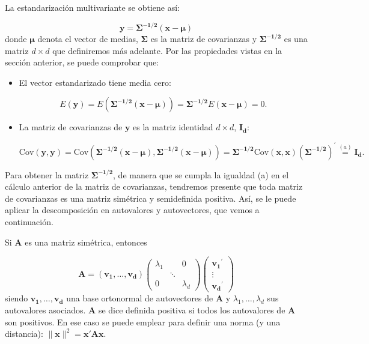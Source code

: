 \documentclass[
  a4paper,
  oneside]{scrbook}
\theoremstyle{definition}
\theoremstyle{definition}
\theoremstyle{definition}
\theoremstyle{definition}
\theoremstyle{remark}
\begin{document}
La estandarización multivariante se obtiene así:

\[\bm{y}=\bm{\Sigma^{-1/2}}(\bm{x}-\bm\mu)\] donde \(\bm\mu\) denota el
vector de medias, \(\bm\Sigma\) es la matriz de covarianzas y
\(\bm{\Sigma^{-1/2}}\) es una matriz \(d\times d\) que definiremos más
adelante. Por las propiedades vistas en la sección anterior, se puede
comprobar que:

\begin{itemize}
\item
  El vector estandarizado tiene media cero:

  \[E(\bm{y})=E(\bm{\Sigma^{-1/2}}(\bm{x}-\bm\mu))=\bm{\Sigma^{-1/2}}E(\bm{x}-\bm\mu)=0.\]
\item
  La matriz de covarianzas de \(\bm{y}\) es la matriz identidad \(d\times d\), \(\bm{I_d}\):

  \[\mbox{Cov}(\bm{y},\bm{y})=\mbox{Cov}(\bm{\Sigma^{-1/2}}(\bm{x}-\bm\mu),\bm{\Sigma^{-1/2}}(\bm{x}-\bm\mu))=\bm{\Sigma^{-1/2}}\mbox{Cov}(\bm{x},\bm{x})(\bm{\Sigma^{-1/2}})^\prime{}
  \stackrel{(a)}{=}\bm{I_d}.\]
\end{itemize}

Para obtener la matriz \(\bm{\Sigma^{-1/2}}\), de manera que se cumpla la
igualdad (a) en el cálculo anterior de la matriz de covarianzas,
tendremos presente que toda matriz de covarianzas es una matriz
simétrica y semidefinida positiva. Así, se le puede aplicar la
descomposición en autovalores y autovectores, que vemos a continuación.

Si \(\bm{A}\) es una matriz simétrica, entonces

\[\bm{A}=\left(\bm{v_1},\ldots,\bm{v_d}\right)\left(\begin{array}{ccc}
\lambda_1 & & 0 \\
 & \ddots & \\
 0 & & \lambda_d
 \end{array}\right)\left(\begin{array}{c}
 \bm{v_1}^{\prime} \\
 \vdots \\
 \bm{v_d}^{\prime}
 \end{array}\right)\]
siendo \(\bm{v_1},\ldots,\bm{v_d}\) una base
ortonormal de autovectores de \(\bm{A}\) y \(\lambda_1,\ldots,\lambda_d\)
sus autovalores asociados. \(\bm{A}\) se dice definida positiva si todos
los autovalores de \(\bm{A}\) son positivos. En ese caso se puede emplear
para definir una norma (y una distancia):
\(\|\bm{x}\|^2=\bm{x}'\bm{A}\bm{x}\).
\end{document}
